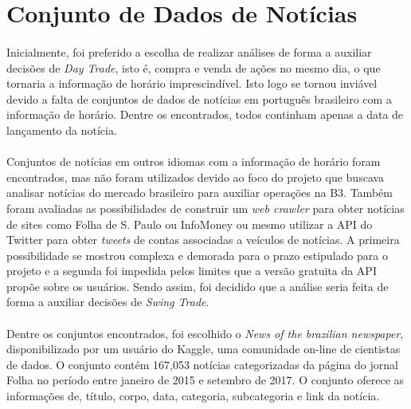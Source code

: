 \documentclass[grad,numbers]{coppe}
\begin{document}
  	\section{Conjunto de Dados de Notícias}
	  	\paragraph{}Inicialmente, foi preferido a escolha de realizar análises de forma a auxiliar decisões de \textit{Day Trade}, isto é, compra e venda de ações no mesmo dia, o que tornaria a informação de horário imprescindível. Isto logo se tornou inviável devido a falta de conjuntos de dados de notícias em português brasileiro com a informação de horário. Dentre os encontrados, todos continham apenas a data de lançamento da notícia.
	  	\paragraph{}Conjuntos de notícias em outros idiomas com a informação de horário foram encontrados, mas não foram utilizados devido ao foco do projeto que buscava analisar notícias do mercado brasileiro para auxiliar operações na B3. Também foram avaliadas as possibilidades de construir um \textit{web crawler} para obter notícias de sites como Folha de S. Paulo\cite{folha} ou InfoMoney\cite{infomoney} ou mesmo utilizar a API do Twitter\cite{twitter-api} para obter \textit{tweets} de contas associadas a veículos de notícias. A primeira possibilidade se mostrou complexa e demorada para o prazo estipulado para o projeto e a segunda foi impedida pelos limites que a versão gratuita da API propõe sobre os usuários. Sendo assim, foi decidido que a análise seria feita de forma a auxiliar decisões de \textit{Swing Trade}.
	  	\paragraph{}Dentre os conjuntos encontrados, foi escolhido o \textit{News of the brazilian newspaper}\cite{folha-news-dataset}, disponibilizado por um usuário do Kaggle, uma comunidade on-line de cientistas de dados. O conjunto contém 167,053 notícias categorizadas da página do jornal Folha no período entre janeiro de 2015 e setembro de 2017. O conjunto oferece as informações de, título, corpo, data, categoria, subcategoria e link da notícia.
\end{document}
